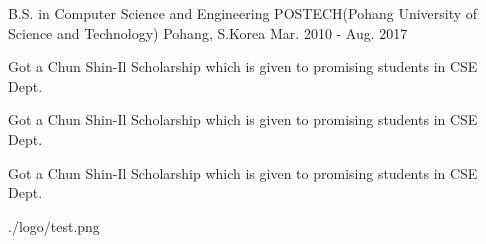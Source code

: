 

\begin{cventries}

  \cventry
    {B.S. in Computer Science and Engineering} %
    {POSTECH(Pohang University of Science and Technology)} %
    {Pohang, S.Korea} %
    {Mar. 2010 - Aug. 2017} %
    {
      \begin{cvitems} %
        \item {Got a Chun Shin-Il Scholarship which is given to promising students in CSE Dept.}
        \item {Got a Chun Shin-Il Scholarship which is given to promising students in CSE Dept.}
        \item {Got a Chun Shin-Il Scholarship which is given to promising students in CSE Dept.}
      \end{cvitems}
    }
    {./logo/test.png} %

\end{cventries}
